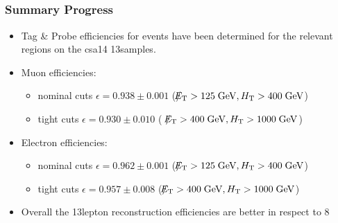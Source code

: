 \documentclass{beamer}
\begin{document}

\subsection{\Zll}
\begin{frame}
\frametitle{Summary Progress \Zll}
 \begin{itemize}
  \item Tag \& Probe efficiencies for \Zll events have been determined for the relevant regions on the csa14 13\tev samples.
  \item Muon efficiencies:
  \begin{itemize}
  \item nominal cuts $\epsilon = 0.938 \pm 0.001$ ($\slash\mkern-12mu{E}_{\text{T}} > 125 \;\text{Ge}\kern-0.06667em\text{V}, H_{\text{T}} > 400 \;\text{Ge}\kern-0.06667em\text{V} $)
   \item tight cuts  $\epsilon = 0.930 \pm 0.010$ ( $\slash\mkern-12mu{E}_{\text{T}} > 400 \;\text{Ge}\kern-0.06667em\text{V}, H_{\text{T}} > 1000 \;\text{Ge}\kern-0.06667em\text{V} $)
  \end{itemize}
  \item Electron efficiencies:
  \begin{itemize}
  \item nominal cuts $\epsilon = 0.962 \pm0.001$ ($\slash\mkern-12mu{E}_{\text{T}} > 125 \;\text{Ge}\kern-0.06667em\text{V}, H_{\text{T}} > 400 \;\text{Ge}\kern-0.06667em\text{V} $)
   \item tight cuts  $\epsilon = 0.957 \pm 0.008$ ($\slash\mkern-12mu{E}_{\text{T}} > 400 \;\text{Ge}\kern-0.06667em\text{V}, H_{\text{T}} > 1000 \;\text{Ge}\kern-0.06667em\text{V} $)
  \end{itemize}
  \item Overall the 13\tev lepton reconstruction efficiencies are better in respect to 8\tev
 \end{itemize}

\end{frame}

\end{document}
